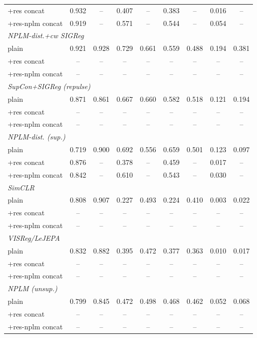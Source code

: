\begin{landscape}
\begin{center}
\begin{longtable}{lcccccccc}
\quad +res concat & 0.932 & -- & 0.407 & -- & 0.383 & -- & 0.016 & -- \\
\quad +res-nplm concat & 0.919 & -- & 0.571 & -- & 0.544 & -- & 0.054 & -- \\
\multicolumn{9}{l}{\emph{NPLM-dist.+cw SIGReg}} \\
\quad plain & 0.921 & 0.928 & 0.729 & 0.661 & 0.559 & 0.488 & 0.194 & 0.381 \\
\quad +res concat & -- & -- & -- & -- & -- & -- & -- & -- \\
\quad +res-nplm concat & -- & -- & -- & -- & -- & -- & -- & -- \\
\multicolumn{9}{l}{\emph{SupCon+SIGReg (repulse)}} \\
\quad plain & 0.871 & 0.861 & 0.667 & 0.660 & 0.582 & 0.518 & 0.121 & 0.194 \\
\quad +res concat & -- & -- & -- & -- & -- & -- & -- & -- \\
\quad +res-nplm concat & -- & -- & -- & -- & -- & -- & -- & -- \\
\multicolumn{9}{l}{\emph{NPLM-dist. (sup.)}} \\
\quad plain & 0.719 & 0.900 & 0.692 & 0.556 & 0.659 & 0.501 & 0.123 & 0.097 \\
\quad +res concat & 0.876 & -- & 0.378 & -- & 0.459 & -- & 0.017 & -- \\
\quad +res-nplm concat & 0.842 & -- & 0.610 & -- & 0.543 & -- & 0.030 & -- \\
\multicolumn{9}{l}{\emph{SimCLR}} \\
\quad plain & 0.808 & 0.907 & 0.227 & 0.493 & 0.224 & 0.410 & 0.003 & 0.022 \\
\quad +res concat & -- & -- & -- & -- & -- & -- & -- & -- \\
\quad +res-nplm concat & -- & -- & -- & -- & -- & -- & -- & -- \\
\multicolumn{9}{l}{\emph{VISReg/LeJEPA}} \\
\quad plain & 0.832 & 0.882 & 0.395 & 0.472 & 0.377 & 0.363 & 0.010 & 0.017 \\
\quad +res concat & -- & -- & -- & -- & -- & -- & -- & -- \\
\quad +res-nplm concat & -- & -- & -- & -- & -- & -- & -- & -- \\
\multicolumn{9}{l}{\emph{NPLM (unsup.)}} \\
\quad plain & 0.799 & 0.845 & 0.472 & 0.498 & 0.468 & 0.462 & 0.052 & 0.068 \\
\quad +res concat & -- & -- & -- & -- & -- & -- & -- & -- \\
\quad +res-nplm concat & -- & -- & -- & -- & -- & -- & -- & -- \\
\end{longtable}
\end{center}
\end{landscape}
